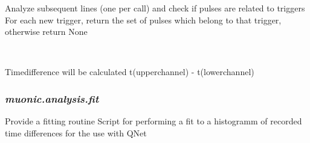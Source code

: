 \documentclass[letterpaper,10pt,english]{sphinxmanual}
\begin{document}
\begin{fulllineitems}

\begin{fulllineitems}
\label{muonic:muonic.analysis.PulseAnalyzer.PulseExtractor.extract}
Analyze subsequent lines (one per call)
and check if pulses are related to triggers
For each new trigger,
return the set of pulses which belong to that trigger,
otherwise return None

\end{fulllineitems}


\end{fulllineitems}


\begin{fulllineitems}
\label{muonic:muonic.analysis.PulseAnalyzer.VelocityTrigger}~

\begin{fulllineitems}
\label{muonic:muonic.analysis.PulseAnalyzer.VelocityTrigger.trigger}
Timedifference will be calculated t(upperchannel) - t(lowerchannel)

\end{fulllineitems}


\end{fulllineitems}



\subsubsection{\emph{muonic.analysis.fit}}
\label{muonic:muonic-analysis-fit}
Provide a fitting routine
\label{muonic:module-muonic.analysis.fit}
Script for performing a fit to a histogramm of recorded 
time differences for the use with QNet

\begin{fulllineitems}
\label{muonic:muonic.analysis.fit.gaussian_fit}
\end{fulllineitems}
\end{document}
